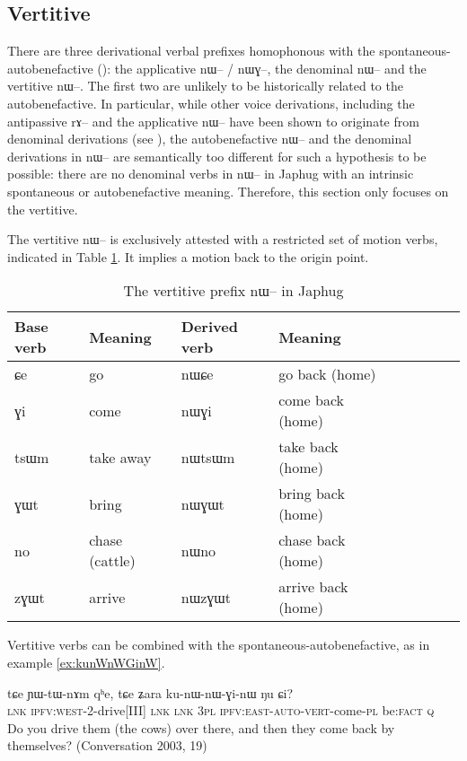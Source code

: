 \documentclass[oldfontcommands,oneside,a4paper,11pt]{article}
\newcommand{\ipa}[1]{{\phon \mbox{#1}}} %
\begin{document}


\subsection{Vertitive}
There are three derivational verbal prefixes homophonous with the spontaneous-autobenefactive (\citealt{jacques13tropative}): the applicative \ipa{nɯ--} / \ipa{nɯɣ--}, the denominal \ipa{nɯ--} and the vertitive \ipa{nɯ--}. The first two are unlikely to be historically related to the autobenefactive. In particular, while other voice derivations, including the antipassive \ipa{rɤ--} and the applicative \ipa{nɯ--}  have been shown to originate from denominal derivations (see \citealt{jacques14antipassive}), the autobenefactive \ipa{nɯ--} and the denominal derivations in \ipa{nɯ--} are semantically too different for such a hypothesis to be possible: there are no denominal verbs in \ipa{nɯ--}  in Japhug with an intrinsic spontaneous or autobenefactive meaning. Therefore, this section only focuses on the vertitive.

The vertitive \ipa{nɯ--}  is exclusively attested with a restricted set of motion verbs, indicated in Table \ref{tab:vertitive}. It implies a motion back to the origin point.
 
\begin{table}[h]
\caption{The vertitive prefix \ipa{nɯ--} in Japhug} \centering \label{tab:vertitive}
\begin{tabular}{lllllllll}
\toprule
Base verb & Meaning & Derived verb & Meaning& \\
\midrule
\ipa{ɕe} & go & \ipa{nɯɕe} & go back (home) & \\
\ipa{ɣi} & come & \ipa{nɯɣi} & come back (home)& \\
\ipa{tsɯm} & take away & \ipa{nɯtsɯm} & take back  (home)& \\
\ipa{ɣɯt} & bring & \ipa{nɯɣɯt} & bring back  (home)& \\
\ipa{no} & chase (cattle) & \ipa{nɯno} & chase back  (home)& \\
\ipa{zɣɯt} & arrive & \ipa{nɯzɣɯt} & arrive back (home)& \\
\bottomrule
\end{tabular}
\end{table}
Vertitive verbs can be combined with the spontaneous-autobenefactive, as in example \ref{ex:kunWnWGinW}. 


\begin{exe}
\ex \label{ex:kunWnWGinW}
\gll 
\ipa{tɕe}  	\ipa{ɲɯ-tɯ-nɤm}  	\ipa{qʰe,}  	\ipa{tɕe}  	\ipa{ʑara}  	\ipa{ku-nɯ-nɯ-ɣi-nɯ}  	\ipa{ŋu}  	\ipa{ɕi?}  \\
\textsc{lnk} \textsc{ipfv:west}-2-drive[III] \textsc{lnk} \textsc{lnk} \textsc{3pl} \textsc{ipfv:east}-\textsc{auto-vert}-come-\textsc{pl} be:\textsc{fact} \textsc{q} \\
\glt Do you drive them (the cows) over there, and then they come back by themselves? (Conversation 2003, 19)
\end{exe}
\end{document}
